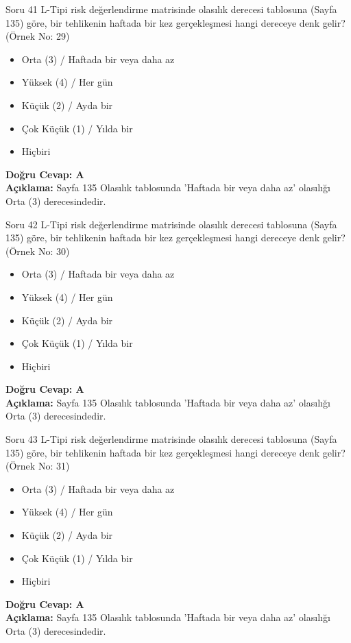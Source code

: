 \documentclass[12pt,a4paper]{article}
\begin{document}
\begin{testcard}{Soru 41}
    L-Tipi risk değerlendirme matrisinde olasılık derecesi tablosuna (Sayfa 135) göre, bir tehlikenin haftada bir kez gerçekleşmesi hangi dereceye denk gelir? (Örnek No: 29)
    \begin{itemize}
        \item[A)] Orta (3) / Haftada bir veya daha az
        \item[B)] Yüksek (4) / Her gün
        \item[C)] Küçük (2) / Ayda bir
        \item[D)] Çok Küçük (1) / Yılda bir
        \item[E)] Hiçbiri
    \end{itemize}
    \tcblower
    \textbf{Doğru Cevap: A} \\
    \textbf{Açıklama:} Sayfa 135 Olasılık tablosunda 'Haftada bir veya daha az' olasılığı Orta (3) derecesindedir.
\end{testcard}

\begin{testcard}{Soru 42}
    L-Tipi risk değerlendirme matrisinde olasılık derecesi tablosuna (Sayfa 135) göre, bir tehlikenin haftada bir kez gerçekleşmesi hangi dereceye denk gelir? (Örnek No: 30)
    \begin{itemize}
        \item[A)] Orta (3) / Haftada bir veya daha az
        \item[B)] Yüksek (4) / Her gün
        \item[C)] Küçük (2) / Ayda bir
        \item[D)] Çok Küçük (1) / Yılda bir
        \item[E)] Hiçbiri
    \end{itemize}
    \tcblower
    \textbf{Doğru Cevap: A} \\
    \textbf{Açıklama:} Sayfa 135 Olasılık tablosunda 'Haftada bir veya daha az' olasılığı Orta (3) derecesindedir.
\end{testcard}

\begin{testcard}{Soru 43}
    L-Tipi risk değerlendirme matrisinde olasılık derecesi tablosuna (Sayfa 135) göre, bir tehlikenin haftada bir kez gerçekleşmesi hangi dereceye denk gelir? (Örnek No: 31)
    \begin{itemize}
        \item[A)] Orta (3) / Haftada bir veya daha az
        \item[B)] Yüksek (4) / Her gün
        \item[C)] Küçük (2) / Ayda bir
        \item[D)] Çok Küçük (1) / Yılda bir
        \item[E)] Hiçbiri
    \end{itemize}
    \tcblower
    \textbf{Doğru Cevap: A} \\
    \textbf{Açıklama:} Sayfa 135 Olasılık tablosunda 'Haftada bir veya daha az' olasılığı Orta (3) derecesindedir.
\end{testcard}
\end{document}
